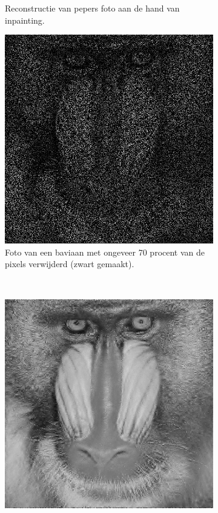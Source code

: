 \begin{figure}
\begin{subfigure}[b]{0.4\textwidth}
        \caption{Reconstructie van pepers foto aan de hand van inpainting. \\ }
        \label{fig:matti_fig_1b}
    \end{subfigure}
    \begin{subfigure}[b]{0.4\textwidth}
        \includegraphics[width=\textwidth]{../src/inpainting/baboon_random_broke_1}
        \caption{Foto van een baviaan met ongeveer 70 procent van de pixels verwijderd (zwart gemaakt). }
        \label{fig:matti_fig_1c}
    \end{subfigure}
    ~ %
    \begin{subfigure}[b]{0.4\textwidth}
        \includegraphics[width=\textwidth]{../src/inpainting/baboon_random_fixed_1}

\end{subfigure}
\end{figure}
